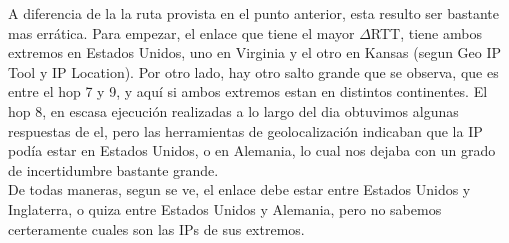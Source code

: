 A diferencia de la la ruta provista en el punto anterior, esta resulto ser bastante mas errática. Para empezar, el enlace que tiene el mayor $\Delta$RTT, tiene ambos extremos en Estados Unidos, uno en Virginia y el otro en Kansas (segun Geo IP Tool y IP Location). Por otro lado, hay otro salto grande que se observa, que es entre el hop 7 y 9, y aquí si ambos extremos estan en distintos continentes. El hop 8, en escasa ejecución realizadas a lo largo del dia obtuvimos algunas respuestas de el, pero las herramientas de geolocalización indicaban que la IP podía estar en Estados Unidos, o en Alemania, lo cual nos dejaba con un grado de incertidumbre bastante grande.\\

De todas maneras, segun se ve, el enlace debe estar entre Estados Unidos y Inglaterra, o quiza entre Estados Unidos y Alemania, pero no sabemos certeramente cuales son las IPs de sus extremos.

